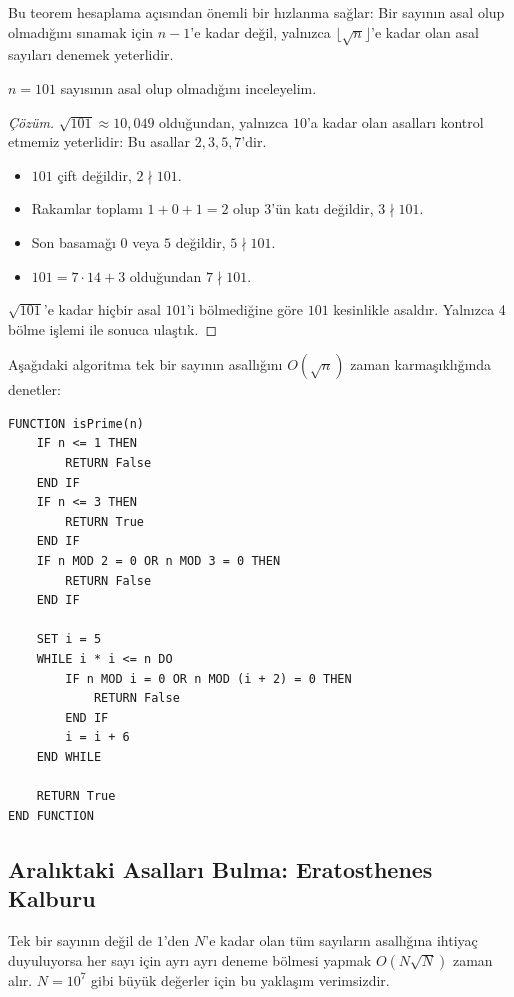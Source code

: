 Bu teorem hesaplama açısından önemli bir hızlanma sağlar: Bir sayının asal olup olmadığını sınamak için $n-1$'e kadar değil, yalnızca $\lfloor\sqrt{n}\rfloor$'e kadar olan asal sayıları denemek yeterlidir.

\begin{example}
$n = 101$ sayısının asal olup olmadığını inceleyelim.
\end{example}
\begin{proof}[Çözüm]
$\sqrt{101} \approx 10{,}049$ olduğundan, yalnızca $10$'a kadar olan asalları kontrol etmemiz yeterlidir: Bu asallar $2, 3, 5, 7$'dir.
\begin{itemize}
    \item $101$ çift değildir, $2 \nmid 101$.
    \item Rakamlar toplamı $1+0+1 = 2$ olup $3$'ün katı değildir, $3 \nmid 101$.
    \item Son basamağı $0$ veya $5$ değildir, $5 \nmid 101$.
    \item $101 = 7 \cdot 14 + 3$ olduğundan $7 \nmid 101$.
\end{itemize}
$\sqrt{101}$'e kadar hiçbir asal $101$'i bölmediğine göre $101$ kesinlikle asaldır. Yalnızca 4 bölme işlemi ile sonuca ulaştık.
\end{proof}

Aşağıdaki algoritma tek bir sayının asallığını $O(\sqrt{n})$ zaman karmaşıklığında denetler:

\begin{lstlisting}
FUNCTION isPrime(n)
    IF n <= 1 THEN
        RETURN False
    END IF
    IF n <= 3 THEN
        RETURN True
    END IF
    IF n MOD 2 = 0 OR n MOD 3 = 0 THEN
        RETURN False
    END IF

    SET i = 5
    WHILE i * i <= n DO
        IF n MOD i = 0 OR n MOD (i + 2) = 0 THEN
            RETURN False
        END IF
        i = i + 6
    END WHILE

    RETURN True
END FUNCTION\end{lstlisting}

\subsection{Aralıktaki Asalları Bulma: Eratosthenes Kalburu}

Tek bir sayının değil de $1$'den $N$'e kadar olan tüm sayıların asallığına ihtiyaç duyuluyorsa her sayı için ayrı ayrı deneme bölmesi yapmak $O(N\sqrt{N})$ zaman alır. $N = 10^7$ gibi büyük değerler için bu yaklaşım verimsizdir.

